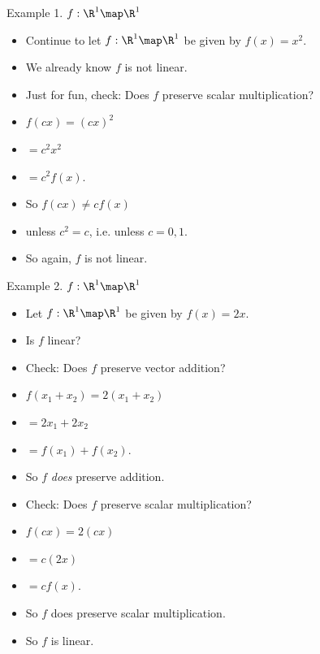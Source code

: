 \documentclass{beamer}
\begin{document}
\begin{frame}{Example 1. $f:\R^1\map\R^1$}

\begin{itemize}
\item Continue to let $f:\R^1\map\R^1$ be given by $f(x) = x^2$.
\item We already know $f$ is not linear.
\item Just for fun, check: Does $f$ preserve scalar multiplication?
\item $f(c x) = (c x)^2$
\item $= c^2 x^2$
\item $= c^2 f(x)$.
\item So $f(c x) \not= c f(x)$
\item unless $c^2 = c$, i.e. unless $c=0, 1$.
\item So again, $f$ is not linear.
\end{itemize}

\end{frame}

\begin{frame}{Example 2. $f:\R^1\map\R^1$}

\begin{itemize}
\item Let $f:\R^1\map\R^1$ be given by $f(x) = 2 x$.
\item Is $f$ linear?
\item Check: Does $f$ preserve vector addition?
\item $f(x_1 + x_2) =  2(x_1 + x_2)$
\item $ = 2 x_1 + 2 x_2$
\item $= f(x_1) + f(x_2)$.
\item So $f$ \emph{does} preserve addition.
\item Check: Does $f$ preserve scalar multiplication?
\item $f(c x) = 2 (c x)$
\item $ = c (2 x) $
\item $= c f(x)$.
\item So $f$ does preserve scalar multiplication.
\item So $f$ is linear.
\end{itemize}

\end{frame}

\beamerdefaultoverlayspecification{}
\end{document}
